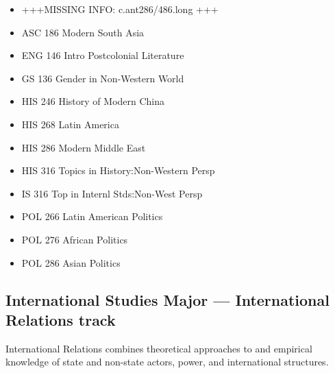 \documentclass[
  letterpaper,
]{scrbook}
\providecommand{\tightlist}{%
  \setlength{\itemsep}{0pt}\setlength{\parskip}{0pt}}
\begin{document}
\begin{enumerate}
  \begin{itemize}
  \tightlist
  \item
    +++MISSING INFO: c.ant286/486.long +++
  \item
    ASC 186 Modern South Asia
  \item
    ENG 146 Intro Postcolonial Literature
  \item
    GS 136 Gender in Non-Western World
  \item
    HIS 246 History of Modern China
  \item
    HIS 268 Latin America
  \item
    HIS 286 Modern Middle East
  \item
    HIS 316 Topics in History:Non-Western Persp
  \item
    IS 316 Top in Internl Stds:Non-West Persp
  \item
    POL 266 Latin American Politics
  \item
    POL 276 African Politics
  \item
    POL 286 Asian Politics
  \end{itemize}
\end{enumerate}

\subsection{International Studies Major --- International Relations
track}\label{international-studies-major-international-relations-track}

International Relations combines theoretical approaches to and empirical
knowledge of state and non-state actors, power, and international
structures.
\end{document}
